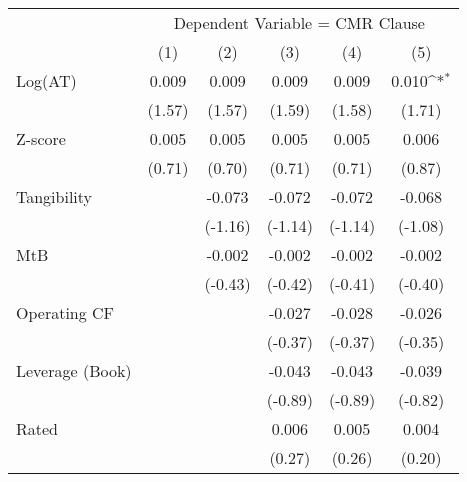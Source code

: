 {
\def\sym#1{\ifmmode^{#1}\else\(^{#1}\)\fi}
\begin{tabular}{l*{5}{c}}
\toprule
                &\multicolumn{5}{c}{Dependent Variable = CMR Clause}                                           \\\cmidrule(lr){2-6}
                &\multicolumn{1}{c}{(1)}         &\multicolumn{1}{c}{(2)}         &\multicolumn{1}{c}{(3)}         &\multicolumn{1}{c}{(4)}         &\multicolumn{1}{c}{(5)}         \\

\midrule Log(AT)         &    0.009         &    0.009         &    0.009         &    0.009         &    0.010\sym{*}  \\
                &   (1.57)         &   (1.57)         &   (1.59)         &   (1.58)         &   (1.71)         \\
Z-score         &    0.005         &    0.005         &    0.005         &    0.005         &    0.006         \\
                &   (0.71)         &   (0.70)         &   (0.71)         &   (0.71)         &   (0.87)         \\
Tangibility     &                  &   -0.073         &   -0.072         &   -0.072         &   -0.068         \\
                &                  &  (-1.16)         &  (-1.14)         &  (-1.14)         &  (-1.08)         \\
MtB             &                  &   -0.002         &   -0.002         &   -0.002         &   -0.002         \\
                &                  &  (-0.43)         &  (-0.42)         &  (-0.41)         &  (-0.40)         \\
Operating CF    &                  &                  &   -0.027         &   -0.028         &   -0.026         \\
                &                  &                  &  (-0.37)         &  (-0.37)         &  (-0.35)         \\
Leverage (Book) &                  &                  &   -0.043         &   -0.043         &   -0.039         \\
                &                  &                  &  (-0.89)         &  (-0.89)         &  (-0.82)         \\
Rated           &                  &                  &    0.006         &    0.005         &    0.004         \\
                &                  &                  &   (0.27)         &   (0.26)         &   (0.20)         \\

\end{tabular}}
